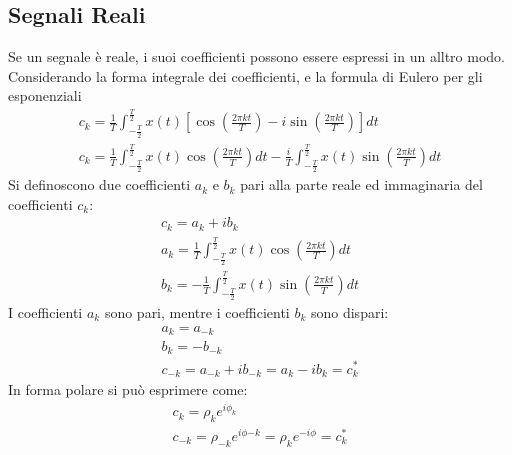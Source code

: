 \documentclass{article}
\numberwithin{equation}{subsection}
\begin{document}
\subsection{Segnali Reali}
Se un segnale è reale, i suoi coefficienti possono essere espressi in un alltro modo. Considerando la forma integrale dei coefficienti, e la formula di Eulero per gli 
esponenziali
\begin{gather*}
    c_k=\displaystyle\frac{1}{T}\int_{-\frac{T}{2}}^{\frac{T}{2}}x(t)\left[\cos\left(\frac{2\pi kt}{T}\right)-i\sin\left(\frac{2\pi kt}{T}\right)\right]dt\\
    c_k=\displaystyle\frac{1}{T}\int_{-\frac{T}{2}}^{\frac{T}{2}}x(t)\cos\left(\frac{2\pi kt}{T}\right)dt-\frac{i}{T}\int_{-\frac{T}{2}}^{\frac{T}{2}}x(t)\sin\left(\frac{2\pi kt}{T}\right)dt
\end{gather*}
Si definoscono due coefficienti $a_k$ e $b_k$ pari alla parte reale ed immaginaria del coefficienti $c_k$:
\begin{gather*}
    c_k=a_k+ib_k\\
    a_k=\displaystyle\frac{1}{T}\int_{-\frac{T}{2}}^{\frac{T}{2}}x(t)\cos\left(\frac{2\pi kt}{T}\right)dt\\
    b_k=\displaystyle-\frac{1}{T}\int_{-\frac{T}{2}}^{\frac{T}{2}}x(t)\sin\left(\frac{2\pi kt}{T}\right)dt
\end{gather*}
I coefficienti $a_k$ sono pari, mentre i coefficienti $b_k$ sono dispari:
\begin{gather*}
    a_k=a_{-k}\\
    b_k=-b_{-k}\\
    c_{-k}=a_{-k}+ib_{-k}=a_{k}-ib_k=c_k^*
\end{gather*}
In forma polare si può esprimere come:
\begin{gather*}
    c_k=\rho_k e^{i\phi_k}\\
    c_{-k}=\rho_{-k}e^{i\phi{-k}}=\rho_k e^{-i\phi}=c_k^*
\end{gather*}
\end{document}
